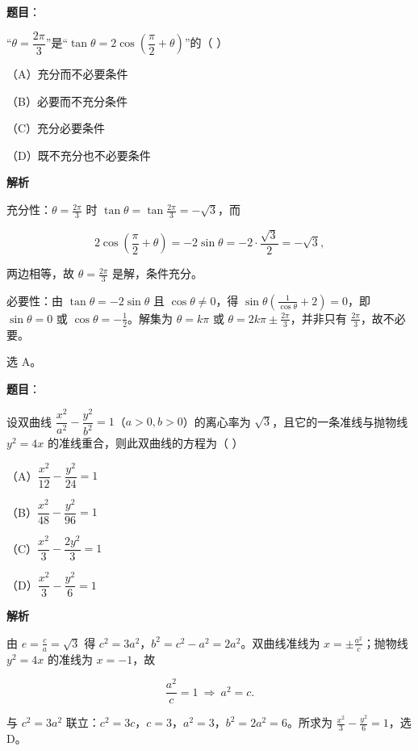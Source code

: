 \begin{answer}

\textbf{题目}：

“$\theta=\dfrac{2\pi}{3}$”是“$\tan\theta=2\cos\left(\dfrac{\pi}{2}+\theta\right)$”的（ ）

（A）充分而不必要条件

（B）必要而不充分条件

（C）充分必要条件

（D）既不充分也不必要条件

\textbf{解析}

充分性：$\theta=\frac{2\pi}3$ 时 $\tan\theta=\tan\frac{2\pi}3=-\sqrt3$，而

\nopagebreak[4]
\[2\cos\left(\frac\pi2+\theta\right)=-2\sin\theta=-2\cdot\frac{\sqrt3}2=-\sqrt3,\]

两边相等，故 $\theta=\frac{2\pi}3$ 是解，条件充分。

必要性：由 $\tan\theta=-2\sin\theta$ 且 $\cos\theta\ne0$，得 $\sin\theta\left(\frac1{\cos\theta}+2\right)=0$，即 $\sin\theta=0$ 或 $\cos\theta=-\frac12$。解集为 $\theta=k\pi$ 或 $\theta=2k\pi\pm\frac{2\pi}3$，并非只有 $\frac{2\pi}3$，故不必要。

选 A。


\end{answer}
\begin{answer}

\textbf{题目}：

设双曲线 $\dfrac{x^2}{a^2}-\dfrac{y^2}{b^2}=1$（$a>0,b>0$）的离心率为 $\sqrt{3}$，且它的一条准线与抛物线 $y^2=4x$ 的准线重合，则此双曲线的方程为（ ）

（A）$\dfrac{x^2}{12}-\dfrac{y^2}{24}=1$

（B）$\dfrac{x^2}{48}-\dfrac{y^2}{96}=1$

（C）$\dfrac{x^2}{3}-\dfrac{2y^2}{3}=1$

（D）$\dfrac{x^2}{3}-\dfrac{y^2}{6}=1$

\textbf{解析}

由 $e=\frac ca=\sqrt3$ 得 $c^2=3a^2$，$b^2=c^2-a^2=2a^2$。双曲线准线为 $x=\pm\frac{a^2}c$；抛物线 $y^2=4x$ 的准线为 $x=-1$，故

\nopagebreak[4]
\[\frac{a^2}{c}=1\ \Rightarrow\ a^2=c .\]

与 $c^2=3a^2$ 联立：$c^2=3c$，$c=3$，$a^2=3$，$b^2=2a^2=6$。所求为 $\frac{x^2}3-\frac{y^2}6=1$，选 D。


\end{answer}
